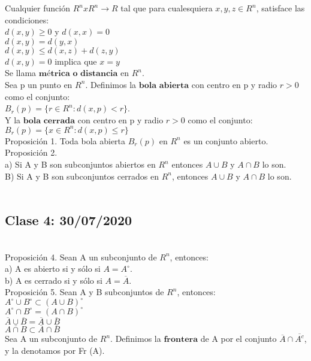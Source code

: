\documentclass[secnumarabic,balancelastpage,amsmath,amssymb]{article}
\begin{document}
Cualquier función $R^{n} x R^{n} \rightarrow R$ tal que para cualesquiera $x, y, z \in R^{n}$, satisface las condiciones:\\
$d(x, y) \geq 0$ y $d(x, x)=0$\\
$d(x, y) =d(y, x)$\\
$d(x, y) \leq d(x, z) + d(z, y)$\\
$d(x, y) = 0$ implica que $x=y$\\
Se llama $\textbf{métrica o distancia}$ en $R^{n}$. \\
Sea p un punto en $R^{n}$. Definimos la $\textbf{bola abierta}$ con centro en p y radio $r>0$ como el conjunto:\\ $B_{r} (p) = \lbrace r \in R^{n} : d(x, p) <r \rbrace$.\\ Y la $\textbf{bola cerrada}$ con centro en p y radio $r>0$ como el conjunto: $B_{r} (p) = \lbrace x \in R^{n} : d(x, p)\leq r \rbrace$\\
Proposición 1. Toda bola abierta $B_{r} (p)$ en $R^{n}$ es un conjunto abierto. \\
Proposición 2. \\
a) Si A y B son subconjuntos abiertos en $R^{n}$ entonces $A\cup B$ y $A \cap B$ lo son. \\
B) Si A y B son subconjuntos cerrados en $R^{n}$, entonces $A\cup B$ y $A\cap B$ lo son. \\\\
\subsection{Clase 4: 30/07/2020}\\
Proposición 4. Sean A un subconjunto de $R^{n}$, entonces:\\
a) A es abierto si y sólo si $A = A^{\circ}$.\\
b) A es cerrado si y sólo si $A = \overline{A}$.\\
Proposición 5. Sean A y B subconjuntos de $R^{n}$, entonces:\\
$A^{\circ} \cup B^{\circ} \subset (A \cup B)^{\circ}$\\
$A^{\circ} \cap B^{\circ} = (A \cap B)^{\circ}$\\
$\overline{A} \cup \overline{B }=\overline {A} \cup \overline{B}$\\
$ \overline {A \cap B} \subset \overline{A} \cap \overline{B}$\\
Sea A un subconjunto de $R^{n}$. Definimos la $\textbf{frontera}$ de A por el conjunto
$\overline{A} \cap \overline{A ^{c}}$, y la denotamos por Fr (A).
\end{document}
